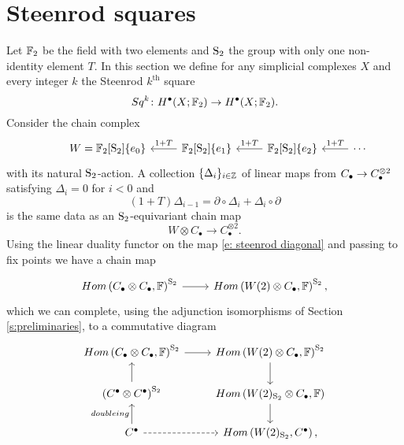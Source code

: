 
\section{Steenrod squares} \label{s:squares}

Let $\F_2$ be the field with two elements and $\S_2$ the group with only one non-identity element $T$.
In this section we define for any simplicial complexes $X$ and every integer $k$ the Steenrod $k^{\mathrm{th}}$ square
\begin{equation*}
Sq^k \colon H^\bullet(X; \F_2) \to H^{\bullet}(X; \F_2).
\end{equation*}
Consider the chain complex
\begin{equation*}
\begin{tikzcd}[column sep=normal]
& W =  \F_2[\S_2]\{e_0\} & \arrow[l, "1+T"'] \F_2[\S_2]\{e_1\} & \arrow[l, "1+T"']
\F_2[\S_2]\{e_2\} & \arrow[l, "1+T"'] \cdots
\end{tikzcd}
\end{equation*}
with its natural $\S_2$-action.
A collection $\{\Delta_i\}_{i \in \Z}$ of linear maps from $\chains \to \chains^{\otimes 2}$ satisfying $\Delta_i = 0$ for $i < 0$ and
\begin{equation*}
(1 + T) \Delta_{i-1} = \partial \circ \Delta_i + \Delta_i \circ \partial
\end{equation*}
is the same data as an $\S_2$-equivariant chain map
\begin{equation} \label{e: steenrod diagonal}
W \otimes C_\bullet \to C_\bullet^{\otimes 2}.
\end{equation}
Using the linear duality functor on the map \eqref{e: steenrod diagonal} and passing to fix points we have a chain map
\begin{equation*}
\begin{tikzcd}
Hom\left(C_\bullet \otimes C_\bullet, \F \right)^{\mathrm S_2} \arrow[r] &
Hom\left(W(2) \otimes C_\bullet, \F \right)^{\mathrm S_2},
\end{tikzcd}
\end{equation*}
which we can complete, using the adjunction isomorphisms of Section \ref{s:preliminaries}, to a commutative diagram
\begin{equation*}
\begin{tikzcd}
Hom\left(C_\bullet \otimes C_\bullet, \F \right)^{\mathrm S_2} \arrow[r] &
Hom\left(W(2) \otimes C_\bullet, \F \right)^{\mathrm S_2} \arrow[d] \\
\left(C^\bullet \otimes C^\bullet\right)^{\mathrm S_2} \arrow[u]&
Hom\left(W(2)_{\mathrm S_2} \otimes C_\bullet, \F \right) \arrow[d] \\
C^\bullet \arrow[u, "doubleing"] \arrow[r, dashed]&
Hom\left(W(2)_{\mathrm S_2}, C^\bullet\right),
\end{tikzcd}
\end{equation*}
